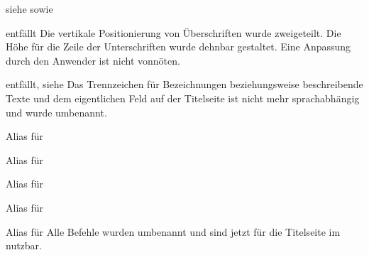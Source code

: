 \begin{Declaration}{}{%
  siehe  sowie 
}
\begin{Declaration}{}{entfällt}
\printdeclarationlist*%
%
Die vertikale Positionierung von Überschriften wurde zweigeteilt. Die Höhe für 
die Zeile der Unterschriften wurde dehnbar gestaltet. Eine Anpassung durch den 
Anwender ist nicht vonnöten.
\end{Declaration}
\end{Declaration}

\begin{Declaration}{}{%
  entfällt, siehe %
}
\printdeclarationlist*%
%
Das Trennzeichen für Bezeichnungen beziehungsweise beschreibende Texte und dem 
eigentlichen Feld auf der Titelseite ist nicht mehr sprachabhängig und wurde 
umbenannt.
\end{Declaration}

\begin{Declaration}{}{%
  Alias für %
}
\begin{Declaration}{}{%
  Alias für %
}
\begin{Declaration}{}{%
  Alias für 
}
\begin{Declaration}{}{%
  Alias für 
}
\begin{Declaration}{}{%
  Alias für %
}
\printdeclarationlist*%
%
Alle Befehle wurden umbenannt und sind jetzt für die Titelseite im \CD nutzbar.
\end{Declaration}
\end{Declaration}
\end{Declaration}
\end{Declaration}
\end{Declaration}

